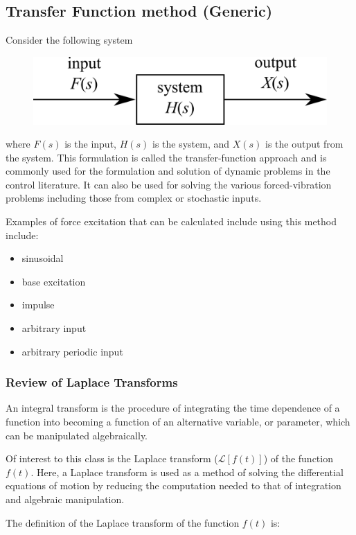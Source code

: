 \documentclass[12pt,letter]{article}
\numberwithin{ex}{section} %
\numberwithin{re}{section} %
\newcommand{\Laplace}[1]{\ensuremath{\mathcal{L}{\left[#1\right]}}}
\begin{document}
		\subsection{Transfer Function method (Generic)}

Consider the following system
\begin{figure}[H]
	\centering
	\includegraphics[]{../Figures/system_input_output.png}
\end{figure}
where $F(s)$ is the input, $H(s)$ is the system, and $X(s)$ is the output from the system. This formulation is called the transfer-function approach and is commonly used for the formulation and solution of dynamic problems in the control literature. It can also be used for solving the various forced-vibration problems including those from complex or stochastic inputs. 

Examples of force excitation that can be calculated include using this method include:
\begin{itemize}
	\item sinusoidal
	\item base excitation
	\item impulse
	\item arbitrary input
	\item arbitrary periodic input
\end{itemize}

		\subsubsection{Review of Laplace Transforms}
		
		 An integral transform is the procedure of integrating the time dependence of a function into becoming a function of an alternative variable, or parameter, which can be manipulated algebraically. 
		
		Of interest to this class is the Laplace transform ($\Laplace{f(t)}$) of the function $f(t)$. Here, a Laplace transform is used as a method of solving the differential equations of motion by reducing the computation needed to that of integration and algebraic manipulation. 
		
		The definition of the Laplace transform of the function $f(t)$ is:
		
\end{document}

